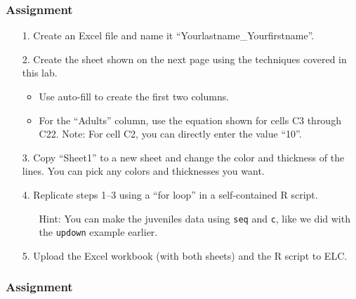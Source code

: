 \documentclass[color=usenames,dvipsnames]{beamer}\usepackage[]{graphicx}\usepackage[]{color}
\newcommand{\inr}[1]{\colorbox{inlinecolor}{\texttt{#1}}}
\begin{document}
\begin{frame}
  \frametitle{Assignment}
  \small %
  \begin{enumerate}
    \item[1.] Create an Excel file and name it ``Yourlastname\_Yourfirstname''.
    \item[2.] Create the sheet shown on the next page using the techniques covered in this lab.
      \begin{itemize}
        \footnotesize
        \item Use auto-fill to create the first two columns.
        \item For the ``Adults'' column, use the equation shown
          for cells C3 through C22. Note: For cell C2, you can directly
          enter the value ``10''.
      \end{itemize}
    \item[3.] Copy ``Sheet1'' to a new sheet and change the color and
      thickness of the lines. You can pick any colors and thicknesses you want.
    \item[4.] Replicate steps 1--3 using a ``for
      loop'' in a self-contained {R} script.
      \begin{itemize}
      \item[] Hint: You can make the juveniles data using \inr{seq}
        and \inr{c}, like we did with the \inr{updown} example earlier.  
      \end{itemize}
    \item[5.] Upload the Excel workbook (with both sheets) and the
      R script to ELC.
  \end{enumerate}
\end{frame}


\begin{frame}
  \frametitle{Assignment}
\end{frame}
\end{document}
